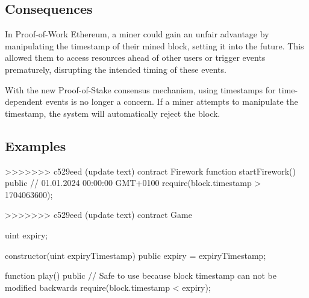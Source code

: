\subsection{Consequences}


In Proof-of-Work Ethereum, a miner could gain an unfair advantage by
manipulating the timestamp of their mined block, setting it into the future.
This allowed them to access resources ahead of other users or trigger events
prematurely, disrupting the intended timing of these events.

With the new Proof-of-Stake consensus mechanism, using timestamps for
time-dependent events is no longer a concern. If a miner attempts to manipulate
the timestamp, the system will automatically reject the block.

\subsection{Examples}

\begin{solidity}[caption=Vulnerable smart contract during proof-of-work Ethereum]
>>>>>>> c529eed (update text)
contract Firework {
  function startFirework() public {
    // 01.01.2024 00:00:00 GMT+0100
    require(block.timestamp > 1704063600);
  }
}
\end{solidity}

\begin{solidity}[caption=Non Vulnerable smart contract during proof-of-work Ethereum]
>>>>>>> c529eed (update text)
contract Game {
  uint expiry;

  constructor(uint expiryTimestamp) public {
    expiry = expiryTimestamp;
  }

  function play() public {
    // Safe to use because block timestamp can not be modified backwards
    require(block.timestamp < expiry);
  }
}
\end{solidity}

    
